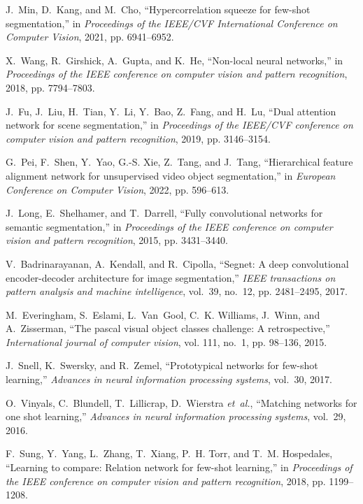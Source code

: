 \documentclass[journal]{IEEEtran}
\begin{document}
\begin{thebibliography}{10}
	J.~Min, D.~Kang, and M.~Cho, ``Hypercorrelation squeeze for few-shot
	segmentation,'' in \emph{Proceedings of the IEEE/CVF International Conference
		on Computer Vision}, 2021, pp. 6941--6952.
	
	X.~Wang, R.~Girshick, A.~Gupta, and K.~He, ``Non-local neural networks,'' in
	\emph{Proceedings of the IEEE conference on computer vision and pattern
		recognition}, 2018, pp. 7794--7803.
	
	J.~Fu, J.~Liu, H.~Tian, Y.~Li, Y.~Bao, Z.~Fang, and H.~Lu, ``Dual attention
	network for scene segmentation,'' in \emph{Proceedings of the IEEE/CVF
		conference on computer vision and pattern recognition}, 2019, pp. 3146--3154.
	
	G.~Pei, F.~Shen, Y.~Yao, G.-S. Xie, Z.~Tang, and J.~Tang, ``Hierarchical
	feature alignment network for unsupervised video object segmentation,'' in
	\emph{European Conference on Computer Vision}, 2022, pp. 596--613.
	
	J.~Long, E.~Shelhamer, and T.~Darrell, ``Fully convolutional networks for
	semantic segmentation,'' in \emph{Proceedings of the IEEE conference on
		computer vision and pattern recognition}, 2015, pp. 3431--3440.
	
	V.~Badrinarayanan, A.~Kendall, and R.~Cipolla, ``Segnet: A deep convolutional
	encoder-decoder architecture for image segmentation,'' \emph{IEEE
		transactions on pattern analysis and machine intelligence}, vol.~39, no.~12,
	pp. 2481--2495, 2017.
	
	M.~Everingham, S.~Eslami, L.~Van~Gool, C.~K. Williams, J.~Winn, and
	A.~Zisserman, ``The pascal visual object classes challenge: A
	retrospective,'' \emph{International journal of computer vision}, vol. 111,
	no.~1, pp. 98--136, 2015.
	
	J.~Snell, K.~Swersky, and R.~Zemel, ``Prototypical networks for few-shot
	learning,'' \emph{Advances in neural information processing systems},
	vol.~30, 2017.
	
	O.~Vinyals, C.~Blundell, T.~Lillicrap, D.~Wierstra \emph{et~al.}, ``Matching
	networks for one shot learning,'' \emph{Advances in neural information
		processing systems}, vol.~29, 2016.
	
	F.~Sung, Y.~Yang, L.~Zhang, T.~Xiang, P.~H. Torr, and T.~M. Hospedales,
	``Learning to compare: Relation network for few-shot learning,'' in
	\emph{Proceedings of the IEEE conference on computer vision and pattern
		recognition}, 2018, pp. 1199--1208.
	

\end{thebibliography}
\end{document}
